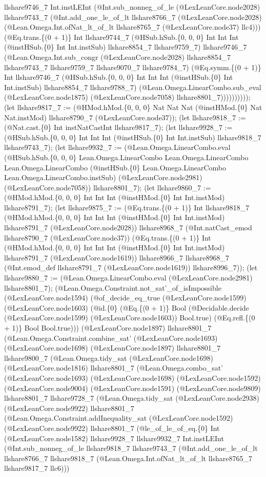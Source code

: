 \documentclass[11pt]{article}
\begin{document}
llshare9746\_7 Int.instLEInt (@Int.sub\_nonneg\_of\_le (@LexLeanCore.node2028) llshare9743\_7 (@Int.add\_one\_le\_of\_lt llshare8766\_7 (@LexLeanCore.node2028) (@Lean.Omega.Int.ofNat\_lt\_of\_lt llshare8765\_7 (@LexLeanCore.node37) llc4))) (@Eq.trans.\{(0 + 1)\} Int llshare9744\_7 (@HSub.hSub.\{0, 0, 0\} Int Int Int (@instHSub.\{0\} Int Int.instSub) llshare8854\_7 llshare9759\_7) llshare9746\_7 (@Lean.Omega.Int.sub\_congr (@LexLeanCore.node2028) llshare8854\_7 llshare9743\_7 llshare9759\_7 llshare9070\_7 llshare9784\_7) (@Eq.symm.\{(0 + 1)\} Int llshare9746\_7 (@HSub.hSub.\{0, 0, 0\} Int Int Int (@instHSub.\{0\} Int Int.instSub) llshare8854\_7 llshare9788\_7) (@Lean.Omega.LinearCombo.sub\_eval (@LexLeanCore.node1875) (@LexLeanCore.node7058) llshare8801\_7)))))))))); (let llshare9817\_7 := (@HMod.hMod.\{0, 0, 0\} Nat Nat Nat (@instHMod.\{0\} Nat Nat.instMod) llshare8790\_7 (@LexLeanCore.node37)); (let llshare9818\_7 := (@Nat.cast.\{0\} Int instNatCastInt llshare9817\_7); (let llshare9928\_7 := (@HSub.hSub.\{0, 0, 0\} Int Int Int (@instHSub.\{0\} Int Int.instSub) llshare9818\_7 llshare9743\_7); (let llshare9932\_7 := (@Lean.Omega.LinearCombo.eval (@HSub.hSub.\{0, 0, 0\} Lean.Omega.LinearCombo Lean.Omega.LinearCombo Lean.Omega.LinearCombo (@instHSub.\{0\} Lean.Omega.LinearCombo Lean.Omega.LinearCombo.instSub) (@LexLeanCore.node2981) (@LexLeanCore.node7058)) llshare8801\_7); (let llshare9860\_7 := (@HMod.hMod.\{0, 0, 0\} Int Int Int (@instHMod.\{0\} Int Int.instMod) llshare8791\_7); (let llshare9875\_7 := (@Eq.trans.\{(0 + 1)\} Int llshare9818\_7 (@HMod.hMod.\{0, 0, 0\} Int Int Int (@instHMod.\{0\} Int Int.instMod) llshare8791\_7 (@LexLeanCore.node2028)) llshare8968\_7 (@Int.natCast\_emod llshare8790\_7 (@LexLeanCore.node37)) (@Eq.trans.\{(0 + 1)\} Int (@HMod.hMod.\{0, 0, 0\} Int Int Int (@instHMod.\{0\} Int Int.instMod) llshare8791\_7 (@LexLeanCore.node1619)) llshare8966\_7 llshare8968\_7 (@Int.emod\_def llshare8791\_7 (@LexLeanCore.node1619)) llshare8996\_7)); (let llshare9880\_7 := (@Lean.Omega.LinearCombo.eval (@LexLeanCore.node2981) llshare8801\_7); (@Lean.Omega.Constraint.not\_sat'\_of\_isImpossible (@LexLeanCore.node1594) (@of\_decide\_eq\_true (@LexLeanCore.node1599) (@LexLeanCore.node1603) (@id.\{0\} (@Eq.\{(0 + 1)\} Bool (@Decidable.decide (@LexLeanCore.node1599) (@LexLeanCore.node1603)) Bool.true) (@Eq.refl.\{(0 + 1)\} Bool Bool.true))) (@LexLeanCore.node1897) llshare8801\_7 (@Lean.Omega.Constraint.combine\_sat' (@LexLeanCore.node1693) (@LexLeanCore.node1698) (@LexLeanCore.node1897) llshare8801\_7 llshare9800\_7 (@Lean.Omega.tidy\_sat (@LexLeanCore.node1698) (@LexLeanCore.node1816) llshare8801\_7 (@Lean.Omega.combo\_sat' (@LexLeanCore.node1693) (@LexLeanCore.node1698) (@LexLeanCore.node1592) (@LexLeanCore.node9004) (@LexLeanCore.node1591) (@LexLeanCore.node9809) llshare8801\_7 llshare9728\_7 (@Lean.Omega.tidy\_sat (@LexLeanCore.node2938) (@LexLeanCore.node9922) llshare8801\_7 (@Lean.Omega.Constraint.addInequality\_sat (@LexLeanCore.node1592) (@LexLeanCore.node9922) llshare8801\_7 (@le\_of\_le\_of\_eq.\{0\} Int (@LexLeanCore.node1582) llshare9928\_7 llshare9932\_7 Int.instLEInt (@Int.sub\_nonneg\_of\_le llshare9818\_7 llshare9743\_7 (@Int.add\_one\_le\_of\_lt llshare8766\_7 llshare9818\_7 (@Lean.Omega.Int.ofNat\_lt\_of\_lt llshare8765\_7 llshare9817\_7 llc6))) 
\end{document}
